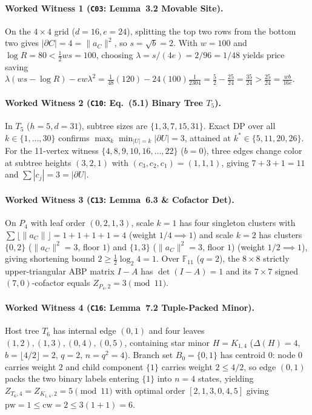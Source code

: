 \documentclass[10pt,twocolumn]{article}
\begin{document}
\paragraph{Worked Witness 1 (\texttt{C03}: Lemma~3.2 Movable Site).}
On the $4\times 4$ grid ($d=16, e=24$), splitting the top two rows from the bottom two gives $|\partial C|=4 = \|a_C\|^2$, so $s=\sqrt{b}=2$. With $w=100$ and $\log R = 80 < \frac{1}{2}ws = 100$, choosing $\lambda = s/(4e) = 2/96 = 1/48$ yields price saving $\lambda(ws-\log R) - ew\lambda^2 = \frac{1}{48}(120) - 24(100)\frac{1}{2304} = \frac{5}{2} - \frac{25}{24} = \frac{35}{24} > \frac{25}{24} = \frac{wb}{16e}$.

\paragraph{Worked Witness 2 (\texttt{C10}: Eq.~(5.1) Binary Tree $T_5$).}
In $T_5$ ($h=5, d=31$), subtree sizes are $\{1,3,7,15,31\}$. Exact DP over all $k\in\{1,\dots,30\}$ confirms $\max_k\min_{|U|=k}|\partial U| = 3$, attained at $k^*\in\{5,11,20,26\}$. For the 11-vertex witness $\{4,8,9,10,16,\dots,22\}$ ($b=0$), three edges change color at subtree heights $(3,2,1)$ with $(c_3,c_2,c_1)=(1,1,1)$, giving $7+3+1=11$ and $\sum|c_j|=3=|\partial U|$.

\paragraph{Worked Witness 3 (\texttt{C13}: Lemma~6.3 \& Cofactor Det).}
On $P_4$ with leaf order $(0,2,1,3)$, scale $k=1$ has four singleton clusters with $\sum\lfloor\|a_C\|\rfloor = 1+1+1+1 = 4$ (weight $1/4\implies 1$) and scale $k=2$ has clusters $\{0,2\}$ ($\|a_C\|^2=3$, floor $1$) and $\{1,3\}$ ($\|a_C\|^2=3$, floor $1$) (weight $1/2\implies 1$), giving shortening bound $2 \ge \frac{1}{2}\log_2 4 = 1$. Over $\mathbb{F}_{11}$ ($q=2$), the $8\times 8$ strictly upper-triangular ABP matrix $I-A$ has $\det(I-A)=1$ and its $7\times 7$ signed $(7,0)$-cofactor equals $Z_{P_4,2} = 3\pmod{11}$.

\paragraph{Worked Witness 4 (\texttt{C16}: Lemma~7.2 Tuple-Packed Minor).}
Host tree $T_6$ has internal edge $(0,1)$ and four leaves $(1,2),(1,3),(0,4),(0,5)$, containing star minor $H=K_{1,4}$ ($\Delta(H)=4$, $b=\lfloor 4/2\rfloor = 2$, $q=2$, $n=q^2=4$). Branch set $B_0=\{0,1\}$ has centroid $0$: node $0$ carries weight $2$ and child component $\{1\}$ carries weight $2 \le 4/2$, so edge $(0,1)$ packs the two binary labels entering $\{1\}$ into $n=4$ states, yielding $Z_{T_6,4} = Z_{K_{1,4},2} = 5\pmod{11}$ with optimal order $[2,1,3,0,4,5]$ giving $\mathrm{pw}=1\le\mathrm{cw}=2\le 3(1+1)=6$.
\end{document}
